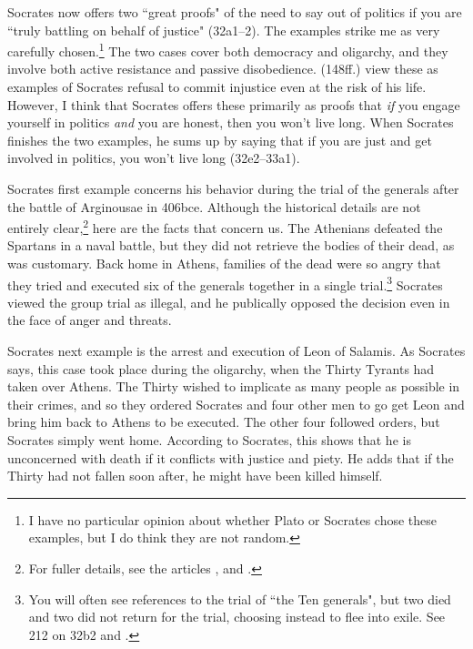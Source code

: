 \documentclass[11pt]{article}
\begin{document}
Socrates now offers two ``great proofs" of the need to say out of politics if you are ``truly battling on behalf of justice" (32a1--2).  The examples strike me as very carefully chosen.\footnote{I have no particular opinion about whether Plato or Socrates chose these examples, but I do think they are not random.}  The two cases cover both democracy and oligarchy, and they involve both active resistance and passive disobedience.  \citet{brickhouse2004} (148ff.) view these as examples of Socrates refusal to commit injustice even at the risk of his life.  However, I think that Socrates offers these primarily as proofs that \emph{if} you engage yourself in politics \emph{and} you are honest, then you won't live long.  When Socrates finishes the two examples, he sums up by saying that if you are just and get involved in politics, you won't live long (32e2--33a1).

Socrates first example concerns his behavior during the trial of the generals after the battle of Arginousae in 406bce.  Although the historical details are not entirely clear,\footnote{For fuller details, see the articles \citet{andrewes1974}, \citet{lang1990} and \citet{lang1992}.} here are the facts that concern us.  The Athenians defeated the Spartans in a naval battle, but they did not retrieve the bodies of their dead, as was customary.  Back home in Athens, families of the dead were so angry that they tried and executed six of the generals together in a single trial.\footnote{You will often see references to the trial of ``the Ten generals", but two died and two did not return for the trial, choosing instead to flee into exile.  See \citet{burnet1924} 212 on 32b2 and \citet{lang1992}.}  Socrates viewed the group trial as illegal, and he publically opposed the decision even in the face of anger and threats.

Socrates next example is the arrest and execution of Leon of Salamis.  As Socrates says, this case took place during the oligarchy, when the Thirty Tyrants had taken over Athens.  The Thirty wished to implicate as many people as possible in their crimes, and so they ordered Socrates and four other men to go get Leon and bring him back to Athens to be executed.  The other four followed orders, but Socrates simply went home.  According to Socrates, this shows that he is unconcerned with death if it conflicts with justice and piety.  He adds that if the Thirty had not fallen soon after, he might have been killed himself.

\end{document}
